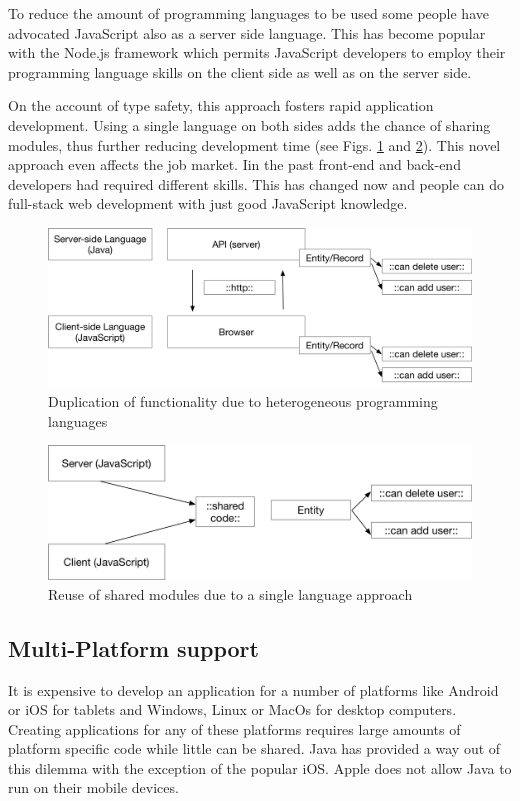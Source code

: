 To reduce the amount of programming languages to be used some people have advocated 
JavaScript also as a server side language. This has become  popular with the Node.js 
framework which permits JavaScript developers to employ their programming language 
skills on the client side as well as on the server side. 

On the account of type safety, this approach fosters rapid application development.
Using a single language on both sides adds the chance of sharing modules,
thus further reducing development time (see Figs. \ref{fig:DS1} and  \ref{fig:DS2}).
This novel approach even affects the job market. Iin the past front-end and back-end developers 
had required different 
skills. This has changed now and people can do full-stack web development with just 
good JavaScript knowledge. 
 

\begin{figure}[H]
	\centering
	\includegraphics[width=0.8\linewidth]{bilder/grundlagen/Entity1.png}
	\caption{Duplication of functionality due to heterogeneous programming languages}
	\label{fig:DS1}
\end{figure}

\begin{figure}[H]
	\centering
	\includegraphics[width=0.8\linewidth]{bilder/grundlagen/Entity2.png}
	\caption{Reuse of shared modules due to a single language approach}
	\label{fig:DS2}
\end{figure}


\subsection{Multi-Platform support}


It is expensive to develop an application for a number of platforms like Android or iOS for tablets and Windows,
Linux or MacOs for desktop computers. Creating applications for any of these platforms
requires large amounts of platform specific code while little can be shared.
Java has provided a way out of this dilemma with the exception of the popular iOS. 
Apple does not allow Java to run
on their mobile devices.


